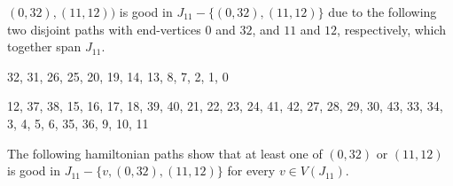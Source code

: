 \documentclass{amcjoucc}
\begin{document}
$(0,32),(11,12))$ is good in $J_{11} - \{(0,32),(11,12)\}$ due to the following two disjoint paths with end-vertices $0$ and $32$, and $11$ and $12$, respectively, which together span $J_{11}$.

\begin{itemize}
{\small
\item 32, 31, 26, 25, 20, 19, 14, 13, 8, 7, 2, 1, 0
\item 12, 37, 38, 15, 16, 17, 18, 39, 40, 21, 22, 23, 24, 41, 42, 27, 28, 29, 30, 43, 33, 34, 3, 4, 5, 6, 35, 36, 9, 10, 11}
\end{itemize}


The following hamiltonian paths show that at least one of $(0,32)$ or $(11,12)$ is good in $J_{11} - \{v,(0,32),(11,12)\}$ for every $v \in V(J_{11})$.
\end{document}
